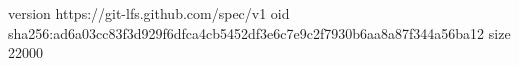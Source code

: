 version https://git-lfs.github.com/spec/v1
oid sha256:ad6a03cc83f3d929f6dfca4cb5452df3e6c7e9c2f7930b6aa8a87f344a56ba12
size 22000
